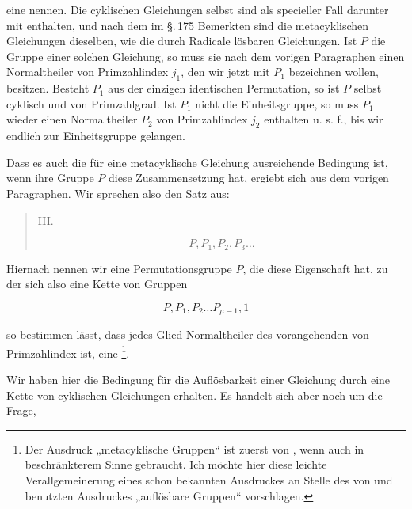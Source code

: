 eine  nennen. Die cyklischen
Gleichungen selbst sind als specieller Fall darunter mit enthalten,
und nach dem im \S.\,175 Bemerkten sind die metacyklischen
Gleichungen dieselben, wie die durch Radicale lösbaren Gleichungen. Ist $P$ die Gruppe einer solchen Gleichung, so muss sie
nach dem vorigen Paragraphen einen Normaltheiler von Primzahlindex $j_1$, den wir jetzt mit $P_1$ bezeichnen wollen, besitzen.
Besteht $P_1$ aus der einzigen identischen Permutation, so ist $P$
selbst cyklisch und von Primzahlgrad. Ist $P_1$ nicht die Einheitsgruppe, so muss $P_1$ wieder einen Normaltheiler $P_2$ von Primzahlindex $j_2$ enthalten u. s. f., bis wir endlich zur Einheitsgruppe
gelangen.

Dass es auch die für eine metacyklische Gleichung ausreichende Bedingung ist, wenn ihre Gruppe $P$ diese Zusammensetzung hat, ergiebt sich aus dem vorigen Paragraphen. Wir
sprechen also den Satz aus:

\begin{quote}
\noindent III.\ 

\[
P, P_1, P_2, P_3 \ldots
\]

\end{quote}

Hiernach nennen wir eine Permutationsgruppe $P$, die diese
Eigenschaft hat, zu der sich also eine Kette von Gruppen

\[
P, P_1, P_2 \ldots P_{\mu-1}, 1
\]

so bestimmen lässt, dass jedes Glied Normaltheiler des vorangehenden von Primzahlindex ist, eine \footnote{Der Ausdruck „metacyklische Gruppen“ ist zuerst von ,
wenn auch in beschränkterem Sinne gebraucht. Ich möchte hier diese
leichte Verallgemeinerung eines schon bekannten Ausdruckes an Stelle des
von  und  benutzten Ausdruckes „auflösbare Gruppen“
vorschlagen.}.

Wir haben hier die Bedingung für die  Auflösbarkeit einer Gleichung durch eine Kette von cyklischen
Gleichungen erhalten. Es handelt sich aber noch um die Frage,
